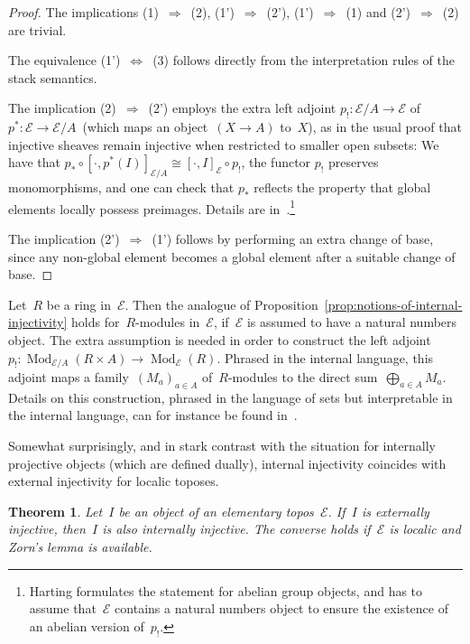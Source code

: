 \documentclass[oneside]{amsart}
\theoremstyle{definition}
\theoremstyle{plain}
\newtheorem{thm}[defn]{Theorem}
\theoremstyle{remark}
\newcommand{\E}{\mathcal{E}}
\DeclareMathOperator{\Mod}{Mod}
\renewcommand{\_}{\mathpunct{.}\,}
\begin{document}
\begin{proof}
The implications (1)~$\Rightarrow$~(2), (1')~$\Rightarrow$~(2'),
(1')~$\Rightarrow$~(1) and (2')~$\Rightarrow$~(2) are trivial.

The equivalence (1')~$\Leftrightarrow$~(3) follows directly from the
interpretation rules of the stack semantics.

The implication (2)~$\Rightarrow$~(2') employs the
extra left adjoint $p_! : \E/A \to \E$ of $p^* : \E
\to \E/A$~(which maps an object~$(X \to A)$ to~$X$), as in the usual proof that
injective sheaves remain injective when
restricted to smaller open subsets: We have that $p_* \circ [\cdot, p^*(I)]_{\E/A}
\cong [\cdot, I]_\E \circ p_!$, the functor $p_!$ preserves monomorphisms, and one
can check that $p_*$ reflects the property that global elements locally possess
preimages. Details are in~\cite[Thm.~1.1]{harting}.\footnote{Harting formulates
the statement for abelian group objects, and has to assume that~$\E$ contains a
natural numbers object to ensure the existence of an abelian version of~$p_!$.}

The implication (2')~$\Rightarrow$~(1') follows by performing an extra change of
base, since any non-global element becomes a global element after a suitable
change of base.
\end{proof}

Let~$R$ be a ring in~$\E$. Then the analogue of
Proposition~\ref{prop:notions-of-internal-injectivity} holds for~$R$-modules
in~$\E$, if~$\E$ is assumed to have a natural numbers object. The extra
assumption is needed in order to construct the left adjoint~$p_! :
\Mod_{\E/A}(R \times A) \to \Mod_\E(R)$. Phrased in the internal language, this
adjoint maps a family~$(M_a)_{a \in A}$ of~$R$-modules to the direct
sum~$\bigoplus_{a \in A} M_a$. Details on this construction, phrased in the
language of sets but interpretable in the internal language, can for instance
be found in~\cite[page~54]{mines-richman-ruitenburg:constructive-algebra}.

Somewhat surprisingly, and in stark contrast with the situation for internally
projective objects (which are defined dually), internal injectivity coincides
with external injectivity for localic toposes.

\begin{thm}\label{thm:injectivity-external-internal}
Let~$I$ be an object of an elementary topos~$\E$. If~$I$ is externally
injective, then~$I$ is also internally injective. The converse holds if~$\E$ is
localic and Zorn's lemma is available.
\end{thm}
\end{document}

